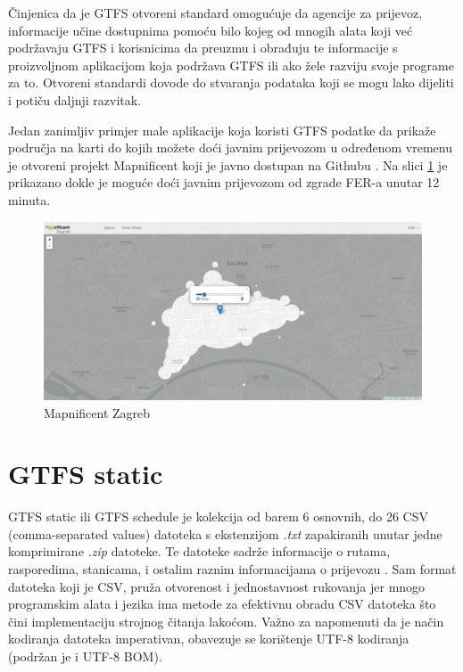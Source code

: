 \documentclass[zavrsnirad]{fer}
\begin{document}
Činjenica da je GTFS otvoreni standard omogućuje da agencije za prijevoz, informacije učine dostupnima pomoću bilo kojeg od mnogih alata koji već podržavaju GTFS i korisnicima da preuzmu i obrađuju te informacije s proizvoljnom aplikacijom koja podržava GTFS ili ako žele razviju svoje programe za to. Otvoreni standardi dovode do stvaranja podataka koji se mogu lako dijeliti i potiču daljnji razvitak.

Jedan zanimljiv primjer male aplikacije koja koristi GTFS podatke da prikaže područja na karti do kojih možete doći javnim prijevozom u određenom vremenu je otvoreni projekt Mapnificent koji je javno dostupan na Githubu \cite{Mapnificent}. Na slici \ref{slk:mapnificent-zagreb} je prikazano dokle je moguće doći javnim prijevozom od zgrade FER-a unutar 12 minuta. 

\begin{figure}[htb]
  \centering
  \includegraphics[width=0.9\linewidth]{Figures/mapnificent-zagreb.jpg} 
  \caption{Mapnificent Zagreb}
  \label{slk:mapnificent-zagreb}
\end{figure}
\newpage
\section{GTFS static}

GTFS static ili GTFS schedule je kolekcija od barem 6 osnovnih, do 26 CSV (comma-separated
values) datoteka s ekstenzijom \textit{.txt} zapakiranih unutar jedne komprimirane \textit{.zip} datoteke. Te datoteke
sadrže informacije o rutama, rasporedima, stanicama, i ostalim raznim informacijama o prijevozu \cite{GTFS-schedule}. Sam format datoteka koji je CSV, pruža otvorenost i jednostavnost rukovanja jer mnogo programskim alata i jezika ima metode za efektivnu obradu CSV datoteka što čini implementaciju strojnog čitanja lakoćom. Važno za napomenuti da je način kodiranja datoteka imperativan, obavezuje se korištenje UTF-8 kodiranja (podržan je i UTF-8 BOM).
\end{document}
